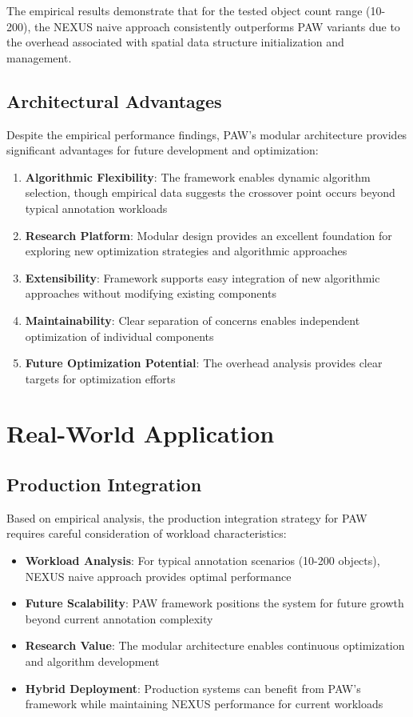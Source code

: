 \documentclass[10pt]{article}
\begin{document}
The empirical results demonstrate that for the tested object count range (10-200), the NEXUS naive approach consistently outperforms PAW variants due to the overhead associated with spatial data structure initialization and management.

\subsection{Architectural Advantages}

Despite the empirical performance findings, PAW's modular architecture provides significant advantages for future development and optimization:

\begin{enumerate}
    \item \textbf{Algorithmic Flexibility}: The framework enables dynamic algorithm selection, though empirical data suggests the crossover point occurs beyond typical annotation workloads
    \item \textbf{Research Platform}: Modular design provides an excellent foundation for exploring new optimization strategies and algorithmic approaches
    \item \textbf{Extensibility}: Framework supports easy integration of new algorithmic approaches without modifying existing components
    \item \textbf{Maintainability}: Clear separation of concerns enables independent optimization of individual components
    \item \textbf{Future Optimization Potential}: The overhead analysis provides clear targets for optimization efforts
\end{enumerate}

\section{Real-World Application}

\subsection{Production Integration}

Based on empirical analysis, the production integration strategy for PAW requires careful consideration of workload characteristics:

\begin{itemize}
    \item \textbf{Workload Analysis}: For typical annotation scenarios (10-200 objects), NEXUS naive approach provides optimal performance
    \item \textbf{Future Scalability}: PAW framework positions the system for future growth beyond current annotation complexity
    \item \textbf{Research Value}: The modular architecture enables continuous optimization and algorithm development
    \item \textbf{Hybrid Deployment}: Production systems can benefit from PAW's framework while maintaining NEXUS performance for current workloads
\end{itemize}
\end{document}
